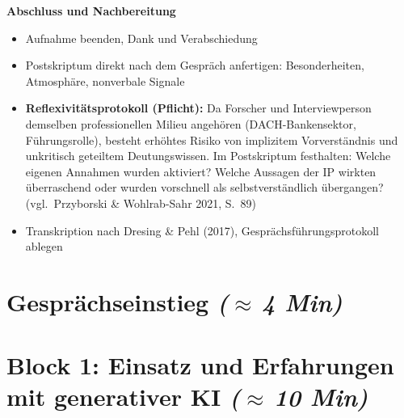 \vspace{0.4em}
\noindent\textbf{Abschluss und Nachbereitung}

\begin{itemize}[leftmargin=1.5em, itemsep=1pt, topsep=2pt]
  \item[$\rightarrow$] Aufnahme beenden, Dank und Verabschiedung
  \item[$\rightarrow$] Postskriptum direkt nach dem Gespräch anfertigen:
    Besonderheiten, Atmosphäre, nonverbale Signale
  \item[$\rightarrow$] \textbf{Reflexivitätsprotokoll (Pflicht):} Da
    Forscher und Interviewperson demselben professionellen Milieu angehören
    (DACH-Bankensektor, Führungsrolle), besteht erhöhtes Risiko von implizitem
    Vorverständnis und unkritisch geteiltem Deutungswissen. Im Postskriptum
    festhalten: Welche eigenen Annahmen wurden aktiviert? Welche Aussagen der
    IP wirkten überraschend oder wurden vorschnell als selbstverständlich
    übergangen? (vgl.\ Przyborski \& Wohlrab-Sahr 2021, S.~89)
  \item[$\rightarrow$] Transkription nach Dresing \& Pehl (2017),
    Gesprächsführungsprotokoll ablegen
\end{itemize}

\blocksep

\section{Gesprächseinstieg \hfill \normalfont\small\itshape ($\approx$\,4 Min)}




\blocksep

\section{Block 1: Einsatz und Erfahrungen mit generativer KI %
  \hfill \normalfont\small\itshape ($\approx$\,10 Min)}

